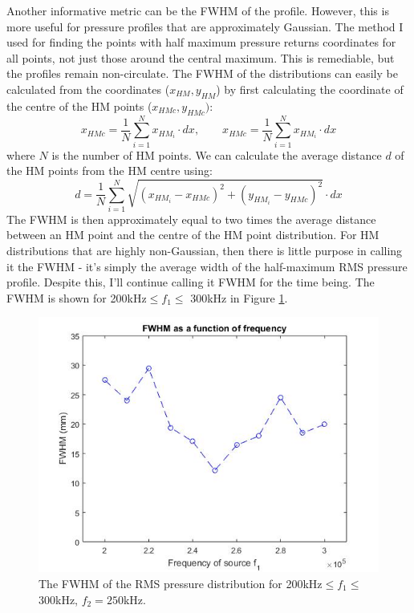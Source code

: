 \documentclass[10pt,a4paper]{article}
\begin{document}
Another informative metric can be the FWHM of the profile. However, this is more useful for pressure profiles that are approximately Gaussian. The method I used for finding the points with half maximum pressure returns coordinates for all points, not just those around the central maximum. This is remediable, but the profiles remain non-circulate. The FWHM of the distributions can easily be calculated from the coordinates ($x_{HM},y_{HM}$) by first calculating the coordinate of the centre of the HM points ($x_{HMc}, y_{HMc})$:
\begin{equation}
x_{HMc} = \frac{1}{N} \sum_{i=1}^N x_{HM_i} \cdot dx, \quad \quad x_{HMc} = \frac{1}{N} \sum_{i=1}^N x_{HM_i} \cdot dx
\end{equation}
where $N$ is the number of HM points. We can calculate the average distance $d$ of the HM points from the HM centre using:
\begin{equation}
d = \frac{1}{N}  \sum_{i=1}^N \sqrt{ (x_{HM_i} - x_{HMc})^2 + (y_{HM_i} - y_{HMc})^2} \cdot dx
\end{equation}
The FWHM is then approximately equal to two times the average distance between an HM point and the centre of the HM point distribution. For HM distributions that are highly non-Gaussian, then there is little purpose in calling it the FWHM - it's simply the average width of the half-maximum RMS pressure profile. Despite this, I'll continue calling it FWHM for the time being. The FWHM is shown for 200kHz$\leq f_1 \leq$ 300kHz in Figure \ref{FWHM_freq}.

\begin{figure}[!h]\label{FWHM_freq}
\centering
\includegraphics[scale=0.6]{FWHM_freq}
\caption{The FWHM of the RMS pressure distribution for 200kHz$\leq f_1 \leq$ 300kHz, $f_2 = 250$kHz.}
\end{figure}
\end{document}
